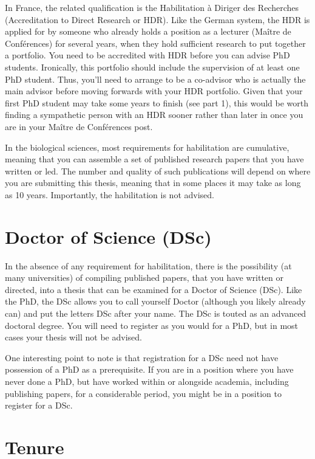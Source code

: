 \documentclass[
]{krantz}
\begin{document}
In France, the related qualification is the Habilitation à Diriger des Recherches (Accreditation to Direct Research or HDR). Like the German system, the HDR is applied for by someone who already holds a position as a lecturer (Maître de Conférences) for several years, when they hold sufficient research to put together a portfolio. You need to be accredited with HDR before you can advise PhD students. Ironically, this portfolio should include the supervision of at least one PhD student. Thus, you'll need to arrange to be a co-advisor who is actually the main advisor before moving forwards with your HDR portfolio. Given that your first PhD student may take some years to finish (see part 1), this would be worth finding a sympathetic person with an HDR sooner rather than later in once you are in your Maître de Conférences post.

In the biological sciences, most requirements for habilitation are cumulative, meaning that you can assemble a set of published research papers that you have written or led. The number and quality of such publications will depend on where you are submitting this thesis, meaning that in some places it may take as long as 10 years. Importantly, the habilitation is not advised.

\hypertarget{doctor-of-science-dsc}{%
\section{Doctor of Science (DSc)}\label{doctor-of-science-dsc}}

In the absence of any requirement for habilitation, there is the possibility (at many universities) of compiling published papers, that you have written or directed, into a thesis that can be examined for a Doctor of Science (DSc). Like the PhD, the DSc allows you to call yourself Doctor (although you likely already can) and put the letters DSc after your name. The DSc is touted as an advanced doctoral degree. You will need to register as you would for a PhD, but in most cases your thesis will not be advised.

One interesting point to note is that registration for a DSc need not have possession of a PhD as a prerequisite. If you are in a position where you have never done a PhD, but have worked within or alongside academia, including publishing papers, for a considerable period, you might be in a position to register for a DSc.

\hypertarget{tenure}{%
\section{Tenure}\label{tenure}}
\end{document}
